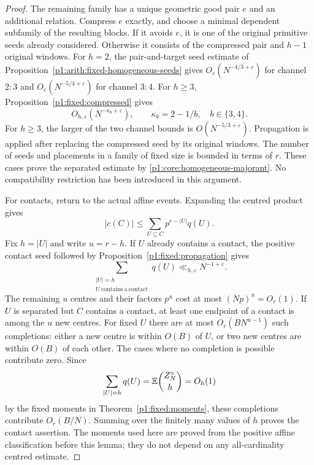 \begin{proof}
The remaining family has a unique geometric good pair $e$ and an
additional relation. Compress $e$ exactly, and choose a minimal dependent
subfamily of the resulting blocks. If it avoids $e$, it is one of the
original primitive seeds already considered. Otherwise it consists of
the compressed pair and $h-1$ original windows. For $h=2$, the
pair-and-target seed estimate of
Proposition~\ref{p1:arith:fixed-homogeneous-seeds} gives
$O_\varepsilon(N^{-4/3+\varepsilon})$ for channel $2:3$ and
$O_\varepsilon(N^{-5/4+\varepsilon})$ for channel $3:4$.
For $h\ge3$, Proposition~\ref{p1:fixed:compressed} gives
\[
 O_{h,\varepsilon}(N^{-\kappa_b+\varepsilon}),
 \qquad \kappa_b=2-1/b,\quad b\in\{3,4\}.
\]
For $h\ge3$, the larger of the two channel bounds is
$O(N^{-5/3+\varepsilon})$.
Propagation is applied after replacing the compressed seed by its original
windows. The number of seeds and placements in a family of fixed size is
bounded in terms of $r$. These cases prove the separated estimate by
\eqref{p1:core:homogeneous-majorant}. No compatibility restriction has
been introduced in this argument.

For contacts, return to the actual affine events. Expanding the centred
product gives
\begin{equation}
 |c(C)|\le\sum_{U\subseteq C}p^{r-|U|}q(U).
 \label{p1:core:contact-expansion}
\end{equation}
Fix $h=|U|$ and write $u=r-h$. If $U$ already contains a contact,
the positive contact seed followed by
Proposition~\ref{p1:fixed:propagation} gives
\[
 \sum_{\substack{|U|=h\\U\ \mathrm{contains\ a\ contact}}}q(U)
       \ll_{h,\varepsilon}N^{-1+\varepsilon}.
\]
The remaining $u$ centres and their factors $p^u$ cost at most
$(Np)^u=O_r(1)$. If $U$ is separated but $C$ contains a contact,
at least one endpoint of a contact is among the $u$ new centres.
For fixed $U$ there are at most $O_r(BN^{u-1})$ such completions:
either a new centre is within $O(B)$ of $U$, or two new centres are
within $O(B)$ of each other. The cases where no completion is possible
contribute zero. Since
\[
 \sum_{|U|=h}q(U)
       =\mathbb E\binom{Z_N^\circ}{h}=O_h(1)
\]
by the fixed moments in Theorem~\ref{p1:fixed:moments}, these
completions contribute $O_r(B/N)$. Summing over the finitely many
values of $h$ proves the contact assertion. The moments used here are
proved from the positive affine classification before this lemma; they
do not depend on any all-cardinality centred estimate.
\end{proof}

